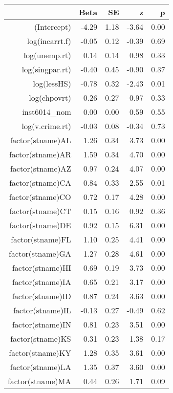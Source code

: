 \begin{table}[ht]
\centering
\begin{tabular}{rrrrr}
  \hline
 & Beta & SE & z & p \\ 
  \hline
(Intercept) & -4.29 & 1.18 & -3.64 & 0.00 \\ 
  log(incarrt.f) & -0.05 & 0.12 & -0.39 & 0.69 \\ 
  log(unemp.rt) & 0.14 & 0.14 & 0.98 & 0.33 \\ 
  log(singpar.rt) & -0.40 & 0.45 & -0.90 & 0.37 \\ 
  log(lessHS) & -0.78 & 0.32 & -2.43 & 0.01 \\ 
  log(chpovrt) & -0.26 & 0.27 & -0.97 & 0.33 \\ 
  inst6014\_nom & 0.00 & 0.00 & 0.59 & 0.55 \\ 
  log(v.crime.rt) & -0.03 & 0.08 & -0.34 & 0.73 \\ 
  factor(stname)AL & 1.26 & 0.34 & 3.73 & 0.00 \\ 
  factor(stname)AR & 1.59 & 0.34 & 4.70 & 0.00 \\ 
  factor(stname)AZ & 0.97 & 0.24 & 4.07 & 0.00 \\ 
  factor(stname)CA & 0.84 & 0.33 & 2.55 & 0.01 \\ 
  factor(stname)CO & 0.72 & 0.17 & 4.28 & 0.00 \\ 
  factor(stname)CT & 0.15 & 0.16 & 0.92 & 0.36 \\ 
  factor(stname)DE & 0.92 & 0.15 & 6.31 & 0.00 \\ 
  factor(stname)FL & 1.10 & 0.25 & 4.41 & 0.00 \\ 
  factor(stname)GA & 1.27 & 0.28 & 4.61 & 0.00 \\ 
  factor(stname)HI & 0.69 & 0.19 & 3.73 & 0.00 \\ 
  factor(stname)IA & 0.65 & 0.21 & 3.17 & 0.00 \\ 
  factor(stname)ID & 0.87 & 0.24 & 3.63 & 0.00 \\ 
  factor(stname)IL & -0.13 & 0.27 & -0.49 & 0.62 \\ 
  factor(stname)IN & 0.81 & 0.23 & 3.51 & 0.00 \\ 
  factor(stname)KS & 0.31 & 0.23 & 1.38 & 0.17 \\ 
  factor(stname)KY & 1.28 & 0.35 & 3.61 & 0.00 \\ 
  factor(stname)LA & 1.35 & 0.37 & 3.60 & 0.00 \\ 
  factor(stname)MA & 0.44 & 0.26 & 1.71 & 0.09 \\ 

\end{tabular}
\end{table}
